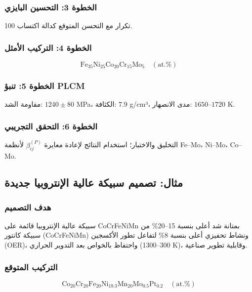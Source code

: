 \documentclass[11pt,a4paper]{article}
\begin{document}
\begin{otherlanguage}{arabic}
		\subsubsection{الخطوة 3: التحسين البايزي}
		100 تكرار مع التحسن المتوقع كدالة اكتساب.
		
		\subsubsection{الخطوة 4: التركيب الأمثل}
		\[
		\text{Fe}_{35}\text{Ni}_{25}\text{Co}_{20}\text{Cr}_{15}\text{Mo}_{5} \quad (\text{at.}\%)
		\]
		
		\subsubsection{الخطوة 5: تنبؤ PLCM}
		مقاومة الشد: \(1240 \pm 80\) MPa، الكثافة: \(7.9\) g/cm³، مدى الانصهار: \(1650\)–\(1720\) K.
		
		\subsubsection{الخطوة 6: التحقق التجريبي}
		التخليق والاختبار؛ استخدام النتائج لإعادة معايرة \(\beta_{ij}^{(P)}\) لأنظمة Fe–Mo، Ni–Mo، Co–Mo.
		
		\subsection{مثال: تصميم سبيكة عالية الإنتروبيا جديدة}
		
		\subsubsection{هدف التصميم}
		سبيكة عالية الإنتروبيا قائمة على CoCrFeNiMn بمتانة شد أعلى بنسبة 15–20\% من سبيكة كانتور (CoCrFeNiMn) ونشاط تحفيزي أعلى بنسبة 8\% لتفاعل تطور الأكسجين (OER)، واحتفاظ بالخواص بعد التدوير الحراري (300–1300 K)، وقابلية تطوير صناعية.
		
		\subsubsection{التركيب المتوقع}
		\[
		\text{Co}_{20}\text{Cr}_{20}\text{Fe}_{20}\text{Ni}_{19.3}\text{Mn}_{20}\text{Mo}_{0.5}\text{Pt}_{0.2}\quad (\text{at.}\%)
		\]
		

\end{otherlanguage}
\end{document}
